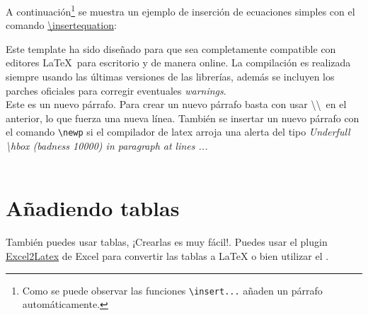 
	A continuación\footnote{Como se puede observar las funciones \texttt{\textbackslash insert...} añaden un párrafo automáticamente.} se muestra un ejemplo de inserción de ecuaciones simples con el comando \href{https://template-latex.github.io/informe.html#hlp-formulae}{\textbackslash insertequation}:


	Este template ha sido diseñado para que sea completamente compatible con editores \LaTeX\ para escritorio y de manera online. La compilación es realizada siempre usando las últimas versiones de las librerías, además se incluyen los parches oficiales para corregir eventuales \textit{warnings}. \\

	Este es un nuevo párrafo. Para crear un nuevo párrafo basta con usar \textbackslash\textbackslash\ en el anterior, lo que fuerza una nueva línea. También se insertar un nuevo párrafo con el comando \texttt{\textbackslash newp} si el compilador de latex arroja una alerta del tipo \textit{Underfull \textbackslash hbox (badness 10000) in paragraph at lines ...} \\

	\lipsum[4] \\

	\lipsum[11]

\section{Añadiendo tablas}

También puedes usar tablas, ¡Crearlas es muy fácil!. Puedes usar el plugin \href{https://www.ctan.org/tex-archive/support/excel2latex}{Excel2Latex} \cite{excel2latex} de Excel para convertir las tablas a \LaTeX\xspace o bien utilizar el  \cite{tablesgenerator}.

